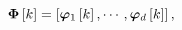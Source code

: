 \begin{equation*}
\boldsymbol{\Phi} \left[ k \right] = \left[ \boldsymbol{\varphi}_1\left[ k \right], \cdots, \boldsymbol{\varphi}_{d}\left[ k \right] \right],
\end{equation*}